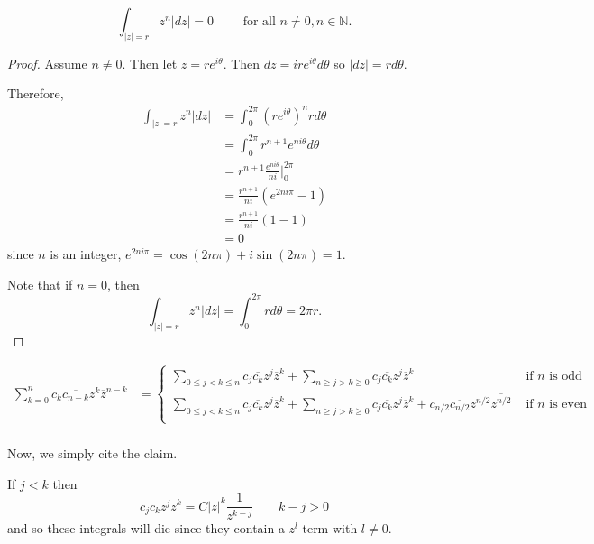 \documentclass[12pt]{Homework}
\begin{document}
\begin{solution}
\begin{comment}
\boxed{n=4} We repeat the above, this time using an even $n.$ Then $$\sum_{k=0}^4z^k\overline{z}^{4-k}=\overline{z}^4+z\overline{z}^3+z^2\overline{z}^2+z^3\overline{z}+z^4=\frac{|z|^8}{z^4}+\frac{|z|^6}{z^2}+|z|^4+z^2|z|^2+z^4.$$ 

Note that all of these integrals will vanish as none of them have a $\frac{1}{z}$ term.

Now, we generalize.
\end{comment}

\begin{claim} $$\int_{|z|=r}z^n|dz|=0\qquad\text{ for all }n\not=0,n\in\mathbb{N}.$$
\begin{proof} Assume $n\not=0.$ Then let $z=re^{i\theta}$. Then $dz=ire^{i\theta}d\theta$ so $|dz|=rd\theta$.

Therefore, \begin{align*}
    \int_{|z|=r}z^n|dz|&=\int_0^{2\pi}(re^{i\theta})^nrd\theta\\
    &=\int_0^{2\pi}r^{n+1}e^{ni\theta}d\theta\\
    &=r^{n+1}\frac{e^{ni\theta}}{ni}\big|_0^{2\pi}\\
    &=\frac{r^{n+1}}{ni}(e^{2ni\pi}-1)\\
    &=\frac{r^{n+1}}{ni}(1-1)\\
    &=0
\end{align*} since $n$ is an integer, $e^{2ni\pi}=\cos(2n\pi)+i\sin(2n\pi)=1.$

Note that if $n=0$, then $$\int_{|z|=r}z^n|dz|=\int_0^{2\pi}rd\theta=2\pi r.$$
\end{proof}
\end{claim}

\begin{align*}
    \sum_{k=0}^nc_k\overline{c_{n-k}}z^k\overline{z}^{n-k}&=\begin{cases}
    \sum_{0\le j<k\le n}c_j\overline{c_k}z^j\overline{z}^k+\sum_{n\ge j>k\ge0}c_j\overline{c_k}z^j\overline{z}^k & \text{ if }n\text{ is odd }\\
    \sum_{0\le j<k\le n}c_j\overline{c_k}z^j\overline{z}^k+\sum_{n\ge j>k\ge0}c_j\overline{c_k}z^j\overline{z}^k  +c_{n/2}\overline{c_{n/2}}z^{n/2}\overline{z^{n/2}}& \text{ if }n\text{ is even }\\
    \end{cases}\\
\end{align*}

Now, we simply cite the claim. 

If $j<k$ then $$c_j\overline{c_k}z^j\overline{z}^k=C|z|^k\frac{1}{z^{k-j}}\qquad k-j>0$$ and so these integrals will die since they contain a $z^l$ term with $l\not=0.$


\end{solution}
\end{document}
